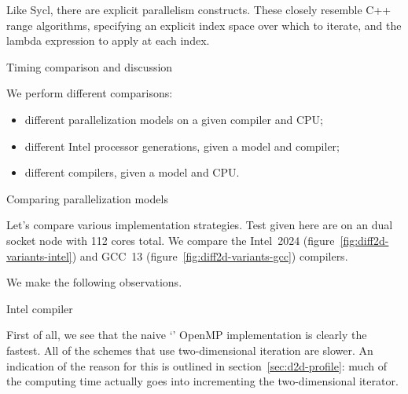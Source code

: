 
Like Sycl, there are explicit parallelism constructs.
These closely resemble C++ range algorithms,
specifying an explicit index space over which to iterate,
and the lambda expression to apply at each index.


 {Timing comparison and discussion}

We perform different comparisons:
\begin{itemize}
\item different parallelization models on a given compiler and CPU;
\item different Intel processor generations, given a model and compiler;
\item different compilers, given a model and CPU.
\end{itemize}

 {Comparing parallelization models}

Let's compare various implementation strategies.
Test given here are on an 
dual socket node with 112 cores total.
We compare the Intel~2024 (figure~\ref{fig:diff2d-variants-intel})
and GCC~13 (figure~\ref{fig:diff2d-variants-gcc})
compilers.

\begin{figure*}[t]
  \begingroup %
  
  
  \endgroup %
  \caption{Comparing implementation strategies, Intel 2024 compiler on a 112-core Sapphire Rapids node.}
  \label{fig:diff2d-variants-intel}
\end{figure*}

\begin{figure*}[t]
  \begingroup %
  
  
  \endgroup %
  \caption{Comparing implementation strategies, Gcc 2024 compiler on a 112-core Sapphire Rapids node.}
  \label{fig:diff2d-variants-gcc}
\end{figure*}

We make the following observations.

 {Intel compiler}

First of all, we see that the naive `' OpenMP implementation
is clearly the fastest.
All of the schemes that use two-dimensional iteration are slower.
An indication of the reason for this is outlined in section~\ref{sec:d2d-profile}:
much of the computing time actually goes into incrementing the
two-dimensional iterator.

